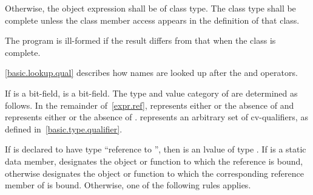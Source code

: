 \pnum
Otherwise, the object expression shall be of class type.
The class type shall be complete
unless the class member access appears in the definition of that class.
\begin{note}
The program is ill-formed if the result differs from that
when the class is complete.
\end{note}
\begin{note}
\ref{basic.lookup.qual} describes how names are looked up after the
 and \tcode{->} operators.
\end{note}

\pnum
If  is a bit-field,  is a bit-field. The
type and value category of  are determined as follows.
In the remainder of~\ref{expr.ref},  represents either
 or the absence of  and  represents
either  or the absence of . 
represents an arbitrary set of cv-qualifiers, as defined
in~\ref{basic.type.qualifier}.

\pnum
If  is declared to have type ``reference to '', then
 is an lvalue of type .
If  is a static data member,
 designates the object or function to which
the reference is bound,
otherwise  designates the object or function to which
the corresponding reference member of  is bound.
Otherwise, one of the following rules applies.

